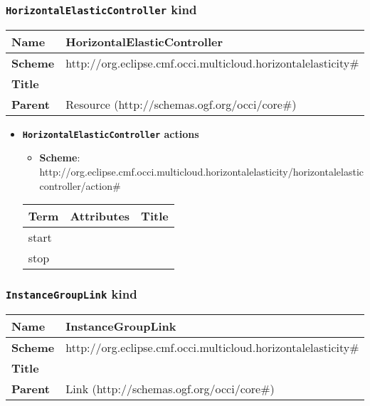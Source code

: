 \subsubsection{\texttt{HorizontalElasticController} kind}
\begin{center}
\begin{tabular}{|l|l|}
  \hline
  \textbf{Name} & HorizontalElasticController \\
  \hline  
  \textbf{Scheme} & http://org.eclipse.cmf.occi.multicloud.horizontalelasticity\# \\
  \hline
  \textbf{Title} &  \\
  \hline
  \textbf{Parent} & Resource (http://schemas.ogf.org/occi/core\#) \\
  \hline
\end{tabular}
\end{center}

\begin{itemize}
\item \textbf{\texttt{HorizontalElasticController} actions}

\begin{itemize}
	\item \textbf{Scheme}: http://org.eclipse.cmf.occi.multicloud.horizontalelasticity/horizontalelasticcontroller/action\#
\end{itemize}

\begin{center}
\begin{tabular}{|l|l|l|}
  \hline
  \textbf{Term}  & \textbf{Attributes} & \textbf{Title} \\
  \hline  
  start & &  \\
  \hline
  stop & &  \\
  \hline
\end{tabular}
\end{center}
\end{itemize}


\subsubsection{\texttt{InstanceGroupLink} kind}
\begin{center}
\begin{tabular}{|l|l|}
  \hline
  \textbf{Name} & InstanceGroupLink \\
  \hline  
  \textbf{Scheme} & http://org.eclipse.cmf.occi.multicloud.horizontalelasticity\# \\
  \hline
  \textbf{Title} &  \\
  \hline
  \textbf{Parent} & Link (http://schemas.ogf.org/occi/core\#) \\
  \hline
\end{tabular}
\end{center}



